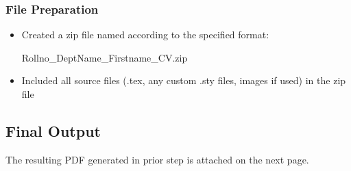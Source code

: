 \subsubsection{File Preparation}
\begin{itemize}
    \item Created a zip file named according to the specified format:
   
    Rollno\_DeptName\_Firstname\_CV.zip
    \item Included all source files (.tex, any custom .sty files, images if used) in the zip file
\end{itemize}

\subsection{Final Output}
The resulting PDF generated in prior step is attached on the next page.
